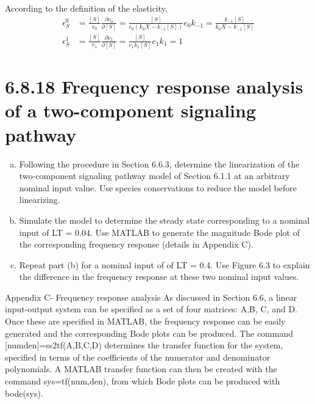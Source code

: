 \documentclass[paper=a4, fontsize=11pt]{scrartcl} %
\numberwithin{equation}{section} %
\numberwithin{figure}{section} %
\numberwithin{table}{section} %
\begin{document}
\begin{enumerate}[a)]
		According to the definition of the elasticity,
		\begin{align*}
			\epsilon_S^0 &= \frac{[S]}{v_0}\frac{\partial v_0}{\partial[S]}=\frac{[S]}{e_0(k_0X - k_{-1}[S])}e_0k_{-1}=\frac{k_{-1}[S]}{k_0X - k_{-1}[S]} \\
			\epsilon_S^1 &= \frac{[S]}{v_1}\frac{\partial v_1}{\partial[S]}=\frac{[S]}{e_1k_1[S]}e_1k_1=1
		\end{align*}

	\end{enumerate}

\section{6.8.18 Frequency response analysis of a two-component signaling pathway}
	\begin{enumerate}[a)]
		\item Following the procedure in Section 6.6.3, determine the linearization of the two-component signaling pathway model of Section 6.1.1 at an arbitrary nominal input value. Use species conservations to reduce the model before linearizing.

		\item Simulate the model to determine the steady state corresponding to a nominal input of LT = 0.04. Use MATLAB to generate the magnitude Bode plot of the corresponding frequency response (details in Appendix C).

		\item  Repeat part (b) for a nominal input of of LT = 0.4. Use Figure 6.3 to explain the difference in the frequency response at these two nominal input values.
	\end{enumerate}
	Appendix C- Frequency response analysis
	As discussed in Section 6.6, a linear input-output system can be specified as a set of four matrices: A,B, C, and D. Once these are specified in MATLAB, the frequency response can be easily generated and the corresponding Bode plots can be produced. The command [numden]=ss2tf(A,B,C,D) determines the transfer function for the system, specified in terms of the coefficients of the numerator and denominator polynomials. A MATLAB transfer function can then be created with the command sys=tf(num,den), from which Bode plots can be produced with bode(sys).
\end{document}
